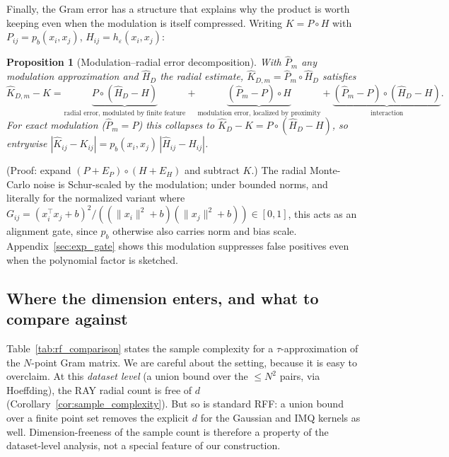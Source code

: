 \documentclass{article}
\newtheorem{proposition}[theorem]{Proposition}
\begin{document}
Finally, the Gram error has a structure that explains why the product is worth keeping even when the modulation is itself compressed. Writing $K=P\circ H$ with $P_{ij}=p_b(x_i,x_j)$, $H_{ij}=h_\varepsilon(x_i,x_j)$:

\begin{proposition}[Modulation--radial error decomposition]\label{prop:gate}
With $\widehat P_m$ any modulation approximation and $\widehat H_D$ the radial estimate, $\widehat K_{D,m}=\widehat P_m\circ\widehat H_D$ satisfies
\[
\widehat K_{D,m}-K=\underbrace{P\circ(\widehat H_D-H)}_{\text{radial error, modulated by finite feature}}+\underbrace{(\widehat P_m-P)\circ H}_{\text{modulation error, localized by proximity}}+\underbrace{(\widehat P_m-P)\circ(\widehat H_D-H)}_{\text{interaction}}.
\]
For exact modulation ($\widehat P_m=P$) this collapses to $\widehat K_D-K=P\circ(\widehat H_D-H)$, so entrywise $|\widehat K_{ij}-K_{ij}|=p_b(x_i,x_j)\,|\widehat H_{ij}-H_{ij}|$.
\end{proposition}
\noindent (Proof: expand $(P+E_P)\circ(H+E_H)$ and subtract $K$.) The radial Monte-Carlo noise is Schur-scaled by the modulation; under bounded norms, and literally for the normalized variant where $G_{ij}=(x_i^\top x_j+b)^2/((\|x_i\|^2+b)(\|x_j\|^2+b))\in[0,1]$, this acts as an alignment gate, since $p_b$ otherwise also carries norm and bias scale. Appendix~\ref{sec:exp_gate} shows this modulation suppresses false positives even when the polynomial factor is sketched.

\subsection{Where the dimension enters, and what to compare against}
\label{sec:comparison}

Table~\ref{tab:rf_comparison} states the sample complexity for a $\tau$-approximation of the $N$-point Gram matrix. We are careful about the setting, because it is easy to overclaim. At this \emph{dataset level} (a union bound over the $\le N^2$ pairs, via Hoeffding), the RAY radial count is free of $d$ (Corollary~\ref{cor:sample_complexity}). But so is standard RFF: a union bound over a finite point set removes the explicit $d$ for the Gaussian and IMQ kernels as well. Dimension-freeness of the sample count is therefore a property of the dataset-level analysis, not a special feature of our construction.
\end{document}
